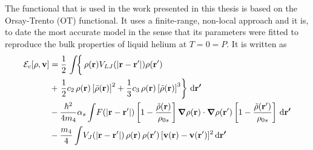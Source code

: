 		The functional that is used in the work presented in this thesis is based on the Orsay-Trento (OT) functional\citep{Dalfovo1995}. It uses a finite-range, non-local approach and it is, to date the most accurate model in the sense that its parameters were fitted to reproduce the bulk properties of liquid helium at $T=0=P$. It is written as
		\begin{align}
			\mathcal{E}_c[\rho ,\bm{\mathrm{v}}] &=  
			\frac{1}{2} \left.\int \! \right\{\rho({\bf r}) V_{LJ}(|{\bf r}-{\bf r'}|) \rho({\bf r'}) \nonumber \\
			&+ \left.\frac{1}{2} c_2\, \rho({\bf r}) \left[{\bar \rho}({\bf r}) \right]^2 
			+ \frac{1}{3} c_3 \, \rho({\bf r}) \left[ {\bar \rho}({\bf r}) \right]^3\right\}\,\mathrm{d}{\bm{\mathrm{r'}}} \nonumber \\
			&- \frac{\hbar^2}{4m_4} \alpha_s \int \! F(|{\bf r}-{\bf r'}|) \left[ 1- \frac{{\tilde \rho}({\bf r})}{\rho_{0s}} \right]\grad{\rho({\bf r})} \cdot \grad{\rho({\bf r'})} \left[ 1- \frac{{\tilde \rho}({\bf r'})}{\rho_{0s}} \right]\,\mathrm{d}{\bm{\mathrm{r'}}} \nonumber \\
			& - \frac{m_4}{4} \int \! V_J(| \mathbf{r} - \mathbf{r}'|)\, \rho(\mathbf{r}) \, \rho(\mathbf{r}')\,  [\mathbf{v}(\mathbf{r})-\mathbf{v}(\mathbf{r}')]^2\,\mathrm{d}{\bm{\mathrm{r'}}} \label{eq:otf}
		\end{align}

